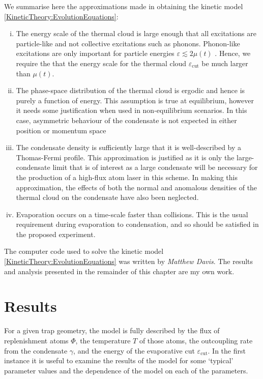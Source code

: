 We summarise here the approximations made in obtaining the kinetic model \eqref{KineticTheory:EvolutionEquations}:
\begin{enumerate}[(i)]
    \item The energy scale of the thermal cloud is large enough that all excitations are particle-like and not collective excitations such as phonons. Phonon-like excitations are only important for particle energies $\varepsilon \lesssim 2\mu(t)$ \citep[\S 8.3.1]{PethickSmith}. Hence, we require the that the energy scale for the thermal cloud $\varepsilon_\text{cut}$ be much larger than $\mu(t)$.
    \item The phase-space distribution of the thermal cloud is ergodic and hence is purely a function of energy. This assumption is true at equilibrium, however it needs some justification when used in non-equilibrium scenarios. In this case, asymmetric behaviour of the condensate is not expected in either position or momentum space 
    \item The condensate density is sufficiently large that it is well-described by a Thomas-Fermi profile. This approximation is justified as it is only the large-condensate limit that is of interest as a large condensate will be necessary for the production of a high-flux atom laser in this scheme. In making this approximation, the effects of both the normal and anomalous densities of the thermal cloud on the condensate have also been neglected.
    \item Evaporation occurs on a time-scale faster than collisions. This is the usual requirement during evaporation to condensation, and so should be satisfied in the proposed experiment.
\end{enumerate}

The computer code used to solve the kinetic model \eqref{KineticTheory:EvolutionEquations} was written by \emph{Matthew Davis}. The results and analysis presented in the remainder of this chapter are my own work.

\section{Results}
\label{KineticTheory:Results}

For a given trap geometry, the model is fully described by the flux of replenishment atoms $\Phi$, the temperature $T$ of those atoms, the outcoupling rate from the condensate $\gamma$, and the energy of the evaporative cut $\varepsilon_\text{cut}$. In the first instance it is useful to examine the results of the model for some `typical' parameter values and the dependence of the model on each of the parameters.


